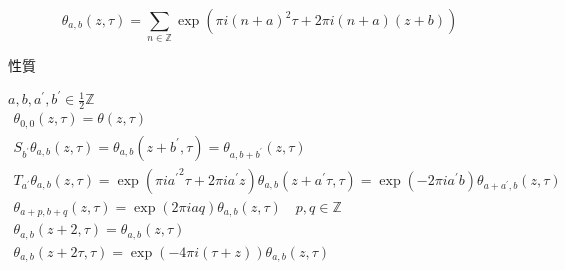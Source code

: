 \documentclass[12pt,b5paper]{ltjsarticle}
\begin{document}
\begin{equation}
 \theta_{a,b}(z,\tau)
  = \sum_{n\in\mathbb{Z}}\exp{(
  \pi i (n+a)^{2}\tau + 2\pi i (n+a)(z+b)
  )}
\end{equation}

性質

 $a,b,a^{\prime},b^{\prime}\in\frac{1}{2}\mathbb{Z}$
\begin{gather}
 \theta_{0,0}(z,\tau)
 = \theta(z,\tau)
 \\
 S_{b^{\prime}}\theta_{a,b}(z,\tau)
 = \theta_{a,b} (z+b^{\prime},\tau)
 = \theta_{a,b+b^{\prime}} (z,\tau)
 \\
 T_{a^{\prime}} \theta_{a,b}(z,\tau)
 =\exp{(\pi i {a^{\prime}}^{2} \tau +2\pi ia^{\prime}z)}
 \theta_{a,b}(z+a^{\prime}\tau,\tau)
 = \exp{(-2\pi i a^{\prime}b)} \theta_{a+a^{\prime},b}(z,\tau)
 \\
 \theta_{a+p,b+q}(z,\tau) = \exp{(2\pi iaq)} \theta_{a,b}(z,\tau) \quad p,q \in\mathbb{Z}
 \\
 \theta_{a,b}(z+2,\tau) = \theta_{a,b}(z,\tau)\\
 \theta_{a,b}(z+2\tau,\tau) = \exp{(-4\pi i(\tau+z))}\theta_{a,b}(z,\tau)
\end{gather}

\hrulefill
\end{document}
